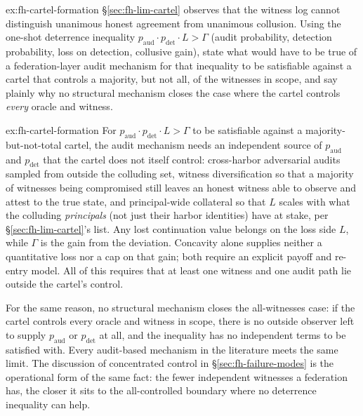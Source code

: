 \documentclass[11pt,a4paper]{article}
\theoremstyle{definition}
\theoremstyle{remark}
\begin{document}
\begin{pdexercise}[kind=Open,rating=3]{ex:fh-cartel-formation}
\S\ref{sec:fh-lim-cartel} observes that the witness log cannot distinguish unanimous honest agreement from unanimous collusion. Using the one-shot deterrence inequality $p_{\mathrm{aud}}\cdot p_{\mathrm{det}}\cdot L>\Gamma$ (audit probability, detection probability, loss on detection, collusive gain), state what would have to be true of a federation-layer audit mechanism for that inequality to be satisfiable against a cartel that controls a majority, but not all, of the witnesses in scope, and say plainly why no structural mechanism closes the case where the cartel controls \emph{every} oracle and witness.
\end{pdexercise}
\begin{pdsolution}{ex:fh-cartel-formation}
For $p_{\mathrm{aud}}\cdot p_{\mathrm{det}}\cdot L>\Gamma$ to be satisfiable against a majority-but-not-total cartel, the audit mechanism needs an independent source of $p_{\mathrm{aud}}$ and $p_{\mathrm{det}}$ that the cartel does not itself control: cross-harbor adversarial audits sampled from outside the colluding set, witness diversification so that a majority of witnesses being compromised still leaves an honest witness able to observe and attest to the true state, and principal-wide collateral so that $L$ scales with what the colluding \emph{principals} (not just their harbor identities) have at stake, per \S\ref{sec:fh-lim-cartel}'s list. Any lost continuation value belongs on the loss side $L$, while $\Gamma$ is the
gain from the deviation. Concavity alone supplies neither a quantitative loss
nor a cap on that gain; both require an explicit payoff and re-entry model. All of this requires that at least one witness and one audit path lie outside the cartel's control.

For the same reason, no structural mechanism closes the all-witnesses case: if the cartel controls every oracle and witness in scope, there is no outside observer left to supply $p_{\mathrm{aud}}$ or $p_{\mathrm{det}}$ at all, and the inequality has no independent terms to be satisfied with. Every audit-based mechanism in the literature meets the same limit. The discussion of concentrated control in \S\ref{sec:fh-failure-modes} is the operational form of the same fact: the fewer independent witnesses a federation has, the closer it sits to the all-controlled boundary where no deterrence inequality can help.
\end{pdsolution}
\end{document}
